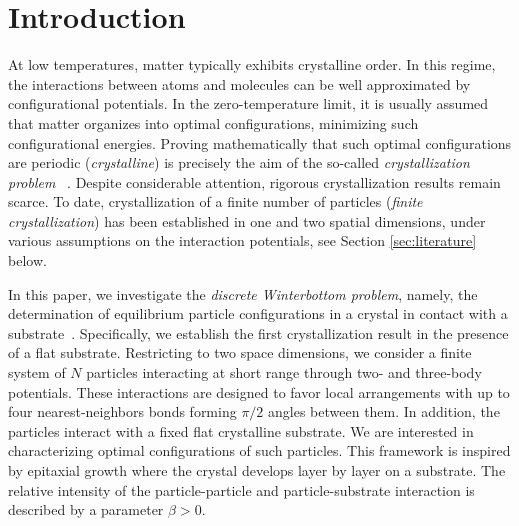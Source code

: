 \documentclass[reqno]{amsart}
\theoremstyle{plain}
\theoremstyle{definition}
\numberwithin{equation}{section}
\begin{document}
\subjclass[2010]{}
 

\maketitle



 

\section{Introduction}

At low temperatures, matter typically exhibits crystalline order. In this
regime, the interactions between atoms and molecules can be well
approximated by configurational potentials. In the zero-temperature
limit, it is usually assumed that matter organizes into optimal
configurations, minimizing such configurational energies. Proving
mathematically that such optimal
configurations are periodic ({\it crystalline}) is precisely the aim of the so-called
{\it crystallization problem} ~\cite{Friesecke-Theil15}. Despite considerable attention,
rigorous crystallization results remain scarce. To date,
crystallization of a finite number of particles ({\it finite crystallization}) has been established in one and two spatial dimensions, under various assumptions on the interaction potentials, see Section
\ref{sec:literature} below.

In this paper, we investigate the {\it discrete Winterbottom
  problem}, namely, the determination of equilibrium particle
configurations in a crystal in contact with a
substrate~\cite{Winterbottom}. Specifically, we establish the first crystallization result in the presence
of a flat substrate.  Restricting to two space dimensions, we consider a
finite system of $N$ 
particles interacting at short range through two- and three-body
potentials. These interactions are designed to favor local
arrangements with up to four nearest-neighbors bonds forming $\pi/2$ angles between them. In
addition, the particles interact with a  fixed  flat crystalline substrate.  We are
interested in characterizing optimal configurations of such  
particles. This framework is inspired
by epitaxial growth where the crystal develops layer by layer on a substrate. The relative intensity of the
particle-particle and particle-substrate interaction is described by a
parameter $\beta>0$.
\end{document}
